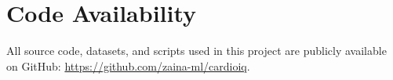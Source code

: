 \documentclass[12pt]{article}
\begin{document}
\section*{Code Availability}
All source code, datasets, and scripts used in this project are publicly available on GitHub: 
\href{https://github.com/zaina-ml/cardioiq}{https://github.com/zaina-ml/cardioiq}.

 

\end{document}
